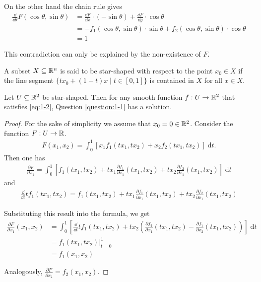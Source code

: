 On the other hand the chain rule gives
\begin{align*}
  \frac{\dd }{\dd\theta} F(\cos\theta, \sin\theta) 
  & = \frac{\dd F}{\dd x}\cdot (-\sin\theta) + \frac{\dd F}{\dd y}\cdot \cos\theta \\
  & = -f_1 (\cos\theta, \sin\theta)\cdot\sin\theta + f_2(\cos\theta, \sin\theta)\cdot \cos\theta\\
  & = 1
\end{align*}

This contradiction can only be explained by the non-existence of $F$.

\begin{definition}
  A subset $X\subseteq {\ensuremath{\mathbb{R}}}^n$ is said to be star-shaped with respect to the point $x_0\in X$ if
  the line segment $\{tx_0+(1-t)x\mid t\in[0,1]\}$ is contained in $X$ for all $x\in X$.
\end{definition}

\begin{theorem}\label{theorem:1-4}
  Let $U\subseteq {\ensuremath{\mathbb{R}}}^2$ be star-shaped. Then for any smooth function $f:U\to {\ensuremath{\mathbb{R}}}^2$ that satisfies
  \eqref{eq:1-2}, Question \ref{question:1-1} has a solution.
\end{theorem}

\begin{proof}
  For the sake of simplicity we assume that $x_0=0\in{\ensuremath{\mathbb{R}}}^2$. Consider the function $F:U\to {\ensuremath{\mathbb{R}}}$.
  \begin{align*}
    F(x_1, x_2) = \int_{0}^{1}{\left[ x_1f_1(tx_1, tx_2) + x_2f_2(tx_1, tx_2) \right] \;\mathrm{d}t}.
  \end{align*}
Then one has
\begin{align*}
  \frac{\partial F}{\partial x_1} 
  = \int_{0}^{1}{\left[ f_1(tx_1, tx_2) + tx_1\frac{\partial f_1}{\partial x_1}(tx_1, tx_2) + tx_2\frac{\partial f_2}{\partial x_1}(tx_1, tx_2) \right] \;\mathrm{d}t}
\end{align*}
and 
\begin{align*}
  \frac{\dd }{\dd t} tf_1(tx_1, tx_2) 
  = f_1(tx_1, tx_2) + tx_1\frac{\partial f_1}{\partial x_1}(tx_1, tx_2) + tx_2\frac{\partial f_2}{\partial x_1}(tx_1, tx_2)
\end{align*}

Substituting this result into the formula, we get
\begin{align*}
  \frac{\partial F}{\partial x_1}(x_1, x_2)
  & = \int_{0}^{1}{\left[\frac{\dd }{\dd t}tf_1(tx_1, tx_2) + tx_2\left(\frac{\partial f_2}{\partial x_1}(tx_1, tx_2) - \frac{\partial f_1}{\partial x_2}(tx_1, tx_2) \right)\right] \;\mathrm{d}t}\\
  & = f_1(tx_1, tx_2)\big|_{t=0}^1\\
  & = f_1(x_1, x_2)
\end{align*}

Analogously, $\frac{\partial F }{\partial x_2} = f_2(x_1, x_2)$.
\end{proof}

